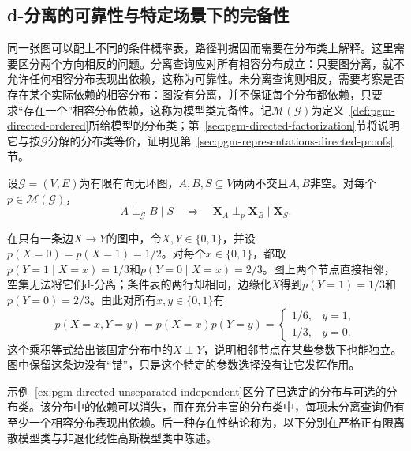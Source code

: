 \subsection{d-分离的可靠性与特定场景下的完备性}
\label{sec:pgm-directed-sound-complete}

同一张图可以配上不同的条件概率表，路径判据因而需要在分布类上解释。这里需要区分两个方向相反的问题。分离查询应对所有相容分布成立：只要图分离，就不允许任何相容分布表现出依赖，这称为可靠性。未分离查询则相反，需要考察是否存在某个实际依赖的相容分布：图没有分离，并不保证每个分布都依赖，只要求“存在一个”相容分布依赖，这称为模型类完备性。记$\mathcal{M}(\mathcal{G})$为定义~\ref{def:pgm-directed-ordered}所给模型的分布类；第~\ref{sec:pgm-directed-factorization}节将说明它与按$\mathcal{G}$分解的分布类等价，证明见第~\ref{sec:pgm-representations-directed-proofs}节。

\begin{theorem}[d-分离的可靠性]
  \label{thm:pgm-directed-soundness}
  设$\mathcal{G}=(V,E)$为有限有向无环图，$A,B,S\subseteq V$两两不交且$A,B$非空。对每个$p\in\mathcal{M}(\mathcal{G})$，
  \begin{equation}
    A\perp_{\mathcal{G}}B\mid S
    \quad\Longrightarrow\quad
    \bm{X}_A\perp_p\bm{X}_B\mid\bm{X}_S.
    \label{eq:pgm-directed-soundness}
  \end{equation}
\end{theorem}

\begin{example}[未分离但独立的固定分布]
  \label{ex:pgm-directed-unseparated-independent}
  在只有一条边$X\to Y$的图中，令$X,Y\in\{0,1\}$，并设$p(X=0)=p(X=1)=1/2$。对每个$x\in\{0,1\}$，都取$p(Y=1\mid X=x)=1/3$和$p(Y=0\mid X=x)=2/3$。图上两个节点直接相邻，空集无法将它们d-分离；条件表的两行却相同，边缘化$X$得到$p(Y=1)=1/3$和$p(Y=0)=2/3$。由此对所有$x,y\in\{0,1\}$有
  \[
    p(X=x,Y=y)
    =
    p(X=x)p(Y=y)
    =
    \begin{cases}
      1/6,&y=1,\\
      1/3,&y=0.
    \end{cases}
  \]
  这个乘积等式给出该固定分布中的$X\perp Y$，说明相邻节点在某些参数下也能独立。图中保留这条边没有“错”，只是这个特定的参数选择没有让它发挥作用。
\end{example}

示例~\ref{ex:pgm-directed-unseparated-independent}区分了已选定的分布与可选的分布类。该分布中的依赖可以消失，而在充分丰富的分布类中，每项未分离查询仍有至少一个相容分布表现出依赖。后一种存在性结论称为，以下分别在严格正有限离散模型类与非退化线性高斯模型类中陈述。

